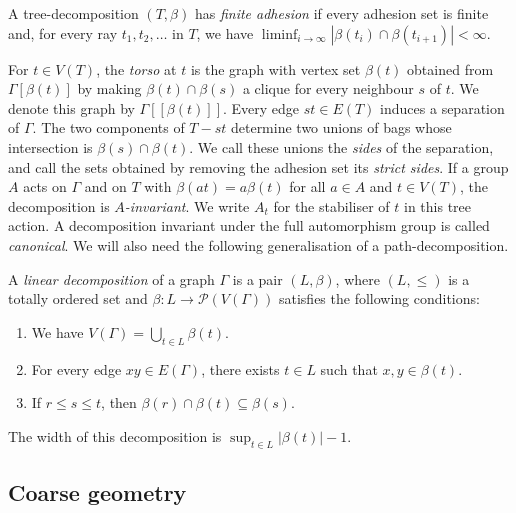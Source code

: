 \documentclass[a4paper]{amsart}
\begin{document}
\begin{definition}\label{def:finite-adhesion}
A tree-decomposition $(T,\beta)$ has \emph{finite adhesion} if every adhesion set is finite and, for every ray $t_1,t_2,\ldots$ in $T$, we have $\liminf_{i\to\infty}|\beta(t_i)\cap\beta(t_{i+1})|<\infty$.
\end{definition}

For $t\in V(T)$, the \emph{torso} at $t$ is the graph with vertex set $\beta(t)$ obtained from $\Gamma[\beta(t)]$ by making $\beta(t)\cap\beta(s)$ a clique for every neighbour $s$ of $t$.
We denote this graph by $\Gamma[\![\beta(t)]\!]$.
Every edge $st\in E(T)$ induces a separation of $\Gamma$.
The two components of $T-st$ determine two unions of bags whose intersection is $\beta(s)\cap\beta(t)$.
We call these unions the \emph{sides} of the separation, and call the sets obtained by removing the adhesion set its \emph{strict sides}.
If a group $A$ acts on $\Gamma$ and on $T$ with $\beta(at)=a\beta(t)$ for all $a\in A$ and $t\in V(T)$, the decomposition is \emph{$A$-invariant}.
We write $A_t$ for the stabiliser of $t$ in this tree action.
A decomposition invariant under the full automorphism group is called \emph{canonical}.
We will also need the following generalisation of a path-decomposition.

\begin{definition}\label{def:linear-decomposition}
A \emph{linear decomposition} of a graph $\Gamma$ is a pair $(L,\beta)$, where $(L,\leq)$ is a totally ordered set and $\beta:L\to\mathcal{P}(V(\Gamma))$ satisfies the following conditions:
\begin{enumerate}
\item[(L1)] We have $V(\Gamma)=\bigcup_{t\in L}\beta(t)$.
\item[(L2)] For every edge $xy\in E(\Gamma)$, there exists $t\in L$ such that $x,y\in\beta(t)$.
\item[(L3)] If $r\leq s\leq t$, then $\beta(r)\cap\beta(t)\subseteq\beta(s)$.
\end{enumerate}
The width of this decomposition is $\sup_{t\in L}|\beta(t)|-1$.
\end{definition}

\subsection{Coarse geometry}\label{subsec:coarse-geometry}
\end{document}
